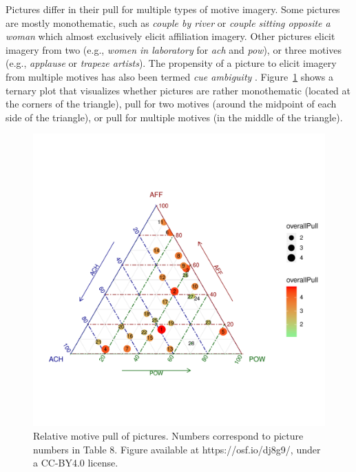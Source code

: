 \documentclass[man,a4paper,mask]{apa6}\usepackage[]{graphicx}\usepackage[]{color}
\newenvironment{knitrout}{}{} %
\begin{document}
Pictures differ in their pull for multiple types of motive imagery. Some pictures are mostly monothematic, such as \emph{couple by river} or \emph{couple sitting opposite a woman} which almost exclusively elicit affiliation imagery. Other pictures elicit imagery from two (e.g., \emph{women in laboratory} for \emph{ach} and \emph{pow}), or three motives (e.g., \emph{applause} or \emph{trapeze artists}). The propensity of a picture to elicit imagery from multiple motives has also been termed \emph{cue ambiguity} \parencite{pang_ContentCodingMethods_2010,smith_MethodologicalConsiderationsSteps_1992,jacobs_MethodInvestigatingCue_1958}.
Figure~\ref{fig:ternary} shows a ternary plot \parencite{hamiltonGgternExtensionGgplot22017} that visualizes whether pictures are rather monothematic (located at the corners of the triangle), pull for two motives (around the midpoint of each side of the triangle), or pull for multiple motives (in the middle of the triangle).


\begin{knitrout}
\color{fgcolor}\begin{figure}

{\centering \includegraphics[width=.9\textwidth]{figure/ternary-1} 

}

\caption[Relative motive pull of pictures]{Relative motive pull of pictures. Numbers correspond to picture numbers in Table 8. Figure available at https://osf.io/dj8g9/, under a CC-BY4.0 license.}\label{fig:ternary}
\end{figure}


\end{knitrout}
\end{document}
